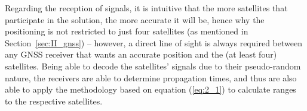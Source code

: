 




Regarding the reception of signals, it is intuitive that the more satellites that participate in the solution, the more accurate it will be, hence why the positioning is not restricted to just four satellites (as mentioned in Section~\ref{sec:II_gnss}) -- however, a direct line of sight is always required between any GNSS receiver that wants an accurate position and the (at least four) satellites. Being able to decode the satellites' signals due to their pseudo-random nature, the receivers are able to determine propagation times, and thus are also able to apply the methodology based on equation (\ref{eq:2_1}) to calculate ranges to the respective satellites.




